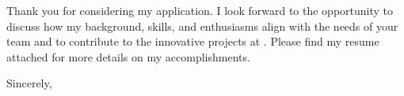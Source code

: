 \hspace{1.5em} Thank you for considering my application. I look forward to the opportunity to discuss how my background, skills, and enthusiasms align with the needs of your team and to contribute to the innovative projects at \company. Please find my resume attached for more details on my accomplishments.
\vspace{1.0em}

Sincerely,\\
\myName\\[1.0em]
